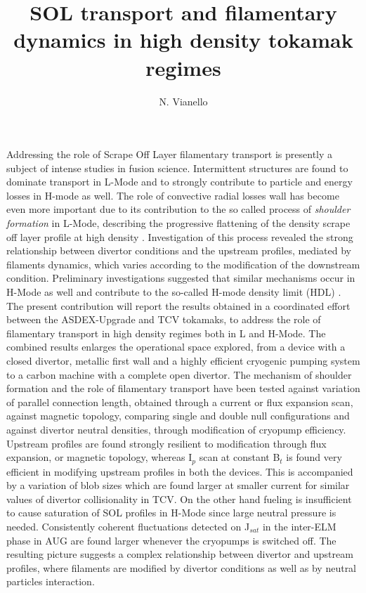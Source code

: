 \documentclass{epsconf}
\title{SOL transport and filamentary dynamics in high density tokamak regimes}
\author{N. Vianello}
\institute{Consorzio RFX, C.so Stati Uniti 4, 35127, Padova, Italy}
\begin{document}
\maketitle
Addressing the role of Scrape Off Layer filamentary transport is
presently a subject of intense studies in fusion science. 
Intermittent structures are found to dominate transport in
L-Mode and to strongly contribute to particle
and energy losses in H-mode as well.
The role of convective radial losses wall has become even more important due to its 
contribution 
to the so called process of \emph{shoulder formation} in
L-Mode, describing the progressive flattening of the density
scrape off layer profile at high density
\cite{LaBombard:2001ks,Carralero:2015gu,Militello:2016hk,Vianello:2017ku}.
Investigation of this process revealed the strong
relationship between divertor conditions and the upstream profiles,
mediated by filaments dynamics,  which varies
according to the modification of the downstream condition.
Preliminary investigations suggested that similar mechanisms
occur in H-Mode as well \cite{Carralero:2017gb} and contribute to
the so-called H-mode density limit (HDL) \cite{bernert2014h}.  
The present contribution will report the results obtained in a
coordinated effort between the ASDEX-Upgrade and TCV tokamaks, to address
the role of filamentary transport in high density regimes both in L
and H-Mode. The combined  results enlarges the operational
space explored, from a device with a closed divertor, metallic
first wall and a highly efficient cryogenic pumping system to a carbon
machine with a complete open divertor.
The mechanism of shoulder formation and the role of filamentary
transport have been tested against variation of parallel connection
length, obtained through a current or flux expansion scan,
against magnetic topology, comparing single and double null configurations
and against divertor neutral densities, through modification of
cryopump efficiency. Upstream profiles are found strongly resilient to
modification through flux expansion, or magnetic topology,
whereas I$_p$ scan at constant B$_t$ is found very efficient in
modifying  upstream profiles in both the devices. This is
accompanied by a variation of blob sizes which are found larger at
smaller current for similar values of divertor collisionality in TCV.
On the other hand
fueling is insufficient to cause saturation of SOL
profiles in H-Mode since large neutral pressure is
needed. Consistently coherent fluctuations detected on J$_{sat}$ in
the inter-ELM phase in AUG are
found larger whenever the cryopumps is switched off.
The resulting picture suggests a complex
relationship between divertor and upstream profiles, where filaments
are modified by divertor conditions as well as by neutral particles
interaction.

\begin{multicols}{2}%
\begingroup
{}
\printbibliography[heading=none]
\endgroup
\end{multicols}
\end{document}
